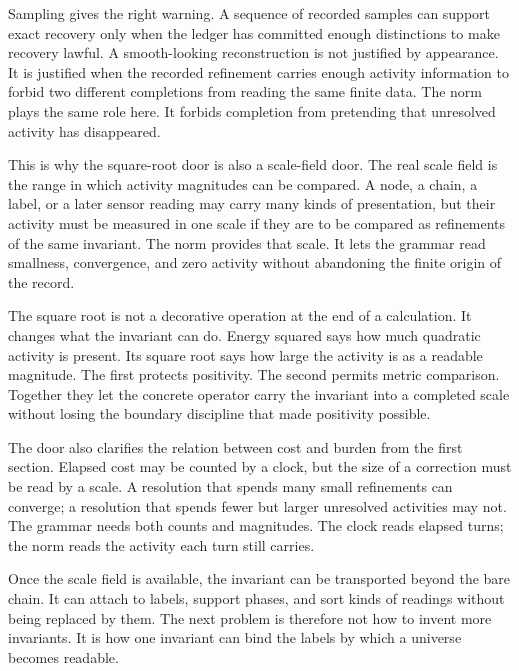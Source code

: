 Sampling gives the right warning. A sequence of recorded samples can support
exact recovery only when the ledger has committed enough distinctions to
make recovery lawful. A smooth-looking reconstruction is not justified by
appearance. It is justified when the recorded refinement carries enough
activity information to forbid two different completions from reading the
same finite data. The norm plays the same role here. It forbids completion
from pretending that unresolved activity has disappeared.

This is why the square-root door is also a scale-field door. The real scale
field is the range in which activity magnitudes can be compared. A node, a
chain, a label, or a later sensor reading may carry many kinds of
presentation, but their activity must be measured in one scale if they are
to be compared as refinements of the same invariant. The norm provides that
scale. It lets the grammar read smallness, convergence, and zero activity
without abandoning the finite origin of the record.

The square root is not a decorative operation at the end of a calculation.
It changes what the invariant can do. Energy squared says how much
quadratic activity is present. Its square root says how large the activity
is as a readable magnitude. The first protects positivity. The second
permits metric comparison. Together they let the concrete operator carry
the invariant into a completed scale without losing the boundary discipline
that made positivity possible.

The door also clarifies the relation between cost and burden from the first
section. Elapsed cost may be counted by a clock, but the size of a correction
must be read by a scale. A resolution that spends many small refinements can
converge; a resolution that spends fewer but larger unresolved activities
may not. The grammar needs both counts and magnitudes. The clock reads
elapsed turns; the norm reads the activity each turn still carries.

Once the scale field is available, the invariant can be transported beyond
the bare chain. It can attach to labels, support phases, and sort kinds of
readings without being replaced by them. The next problem is therefore not
how to invent more invariants. It is how one invariant can bind the labels
by which a universe becomes readable.
